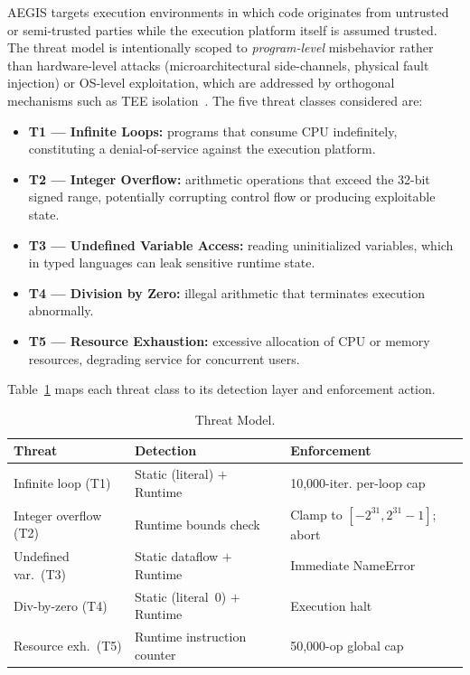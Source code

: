 \documentclass[conference]{IEEEtran}
\begin{document}
AEGIS targets execution environments in which code originates from
untrusted or semi-trusted parties while the execution platform
itself is assumed trusted. The threat model is intentionally
scoped to \emph{program-level} misbehavior rather than
hardware-level attacks (microarchitectural side-channels, physical
fault injection) or OS-level exploitation, which are addressed by
orthogonal mechanisms such as TEE isolation~\cite{menetrey2024sgx}.
The five threat classes considered are:

\begin{itemize}
  \setlength\itemsep{1pt}
  \item \textbf{T1 — Infinite Loops:} programs that consume CPU
        indefinitely, constituting a denial-of-service against
        the execution platform.
  \item \textbf{T2 — Integer Overflow:} arithmetic operations that
        exceed the 32-bit signed range, potentially corrupting
        control flow or producing exploitable state.
  \item \textbf{T3 — Undefined Variable Access:} reading
        uninitialized variables, which in typed languages can
        leak sensitive runtime state.
  \item \textbf{T4 — Division by Zero:} illegal arithmetic that
        terminates execution abnormally.
  \item \textbf{T5 — Resource Exhaustion:} excessive allocation of
        CPU or memory resources, degrading service for concurrent
        users.
\end{itemize}

Table~\ref{tab:threats} maps each threat class to its detection
layer and enforcement action.

\begin{table}[t]
\caption{Threat Model.}
\label{tab:threats}
\centering
\renewcommand{\arraystretch}{1.18}
\small
\begin{tabular}{@{} p{1.55cm} p{2.0cm} p{2.55cm} @{}}
\toprule
\textbf{Threat} & \textbf{Detection} & \textbf{Enforcement} \\
\midrule
Infinite loop (T1)     & Static (literal) $+$ Runtime & 10,000-iter.
                         per-loop cap \\[2pt]
Integer overflow (T2)  & Runtime bounds check  & Clamp to $[-2^{31},
                         2^{31}-1]$; abort \\[2pt]
Undefined var.\ (T3)   & Static dataflow $+$ Runtime & Immediate
                         NameError \\[2pt]
Div-by-zero (T4)       & Static (literal~0) $+$ Runtime & Execution
                         halt \\[2pt]
Resource exh.\ (T5)    & Runtime instruction counter & 50,000-op
                         global cap \\
\bottomrule
\end{tabular}
\end{table}
\end{document}
